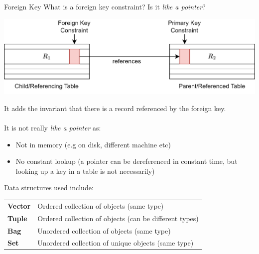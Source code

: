 \begin{examplebox}{Foreign Key}
  What is a foreign key constraint? Is it \textit{like a pointer}?
  \tcblower
  \begin{center}
    \includegraphics[width=.7\textwidth]{relational_algebra/images/example_answer_foreign_key.drawio.png}
  \end{center}
  It adds the invariant that there is a record referenced by the foreign key.
  \\
  \\ It is not really \textit{like a pointer} as:
  \begin{itemize}
    \item Not in memory (e.g on disk, different machine etc)
    \item No constant lookup (a pointer can be dereferenced in constant time, but looking up a key in a table is not necessarily)
  \end{itemize}
\end{examplebox}
\noindent
Data structures used include:
\begin{center}
  \begin{tabular}{l p{}}
    \textbf{Vector} & Ordered collection of objects (same type)              \\
    \textbf{Tuple}  & Ordered collection of objects (can be different types) \\
    \textbf{Bag}    & Unordered collection of objects (same type)            \\
    \textbf{Set}    & Unordered collection of unique objects (same type)     \\
  \end{tabular}
\end{center}

